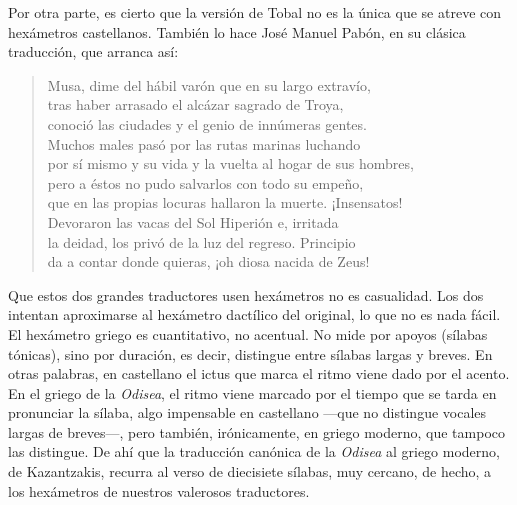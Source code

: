 Por otra parte, es cierto que la versión de Tobal no es la única que se atreve con hexámetros castellanos. También lo hace José Manuel Pabón, en su clásica traducción, que arranca así:


\begin{verse}
Musa, dime del hábil varón que en su largo extravío,\\
tras haber arrasado el alcázar sagrado de Troya,\\
conoció las ciudades y el genio de innúmeras gentes.\\
Muchos males pasó por las rutas marinas luchando\\
por sí mismo y su vida y la vuelta al hogar de sus hombres,\\
pero a éstos no pudo salvarlos con todo su empeño,\\
que en las propias locuras hallaron la muerte. ¡Insensatos!\\
Devoraron las vacas del Sol Hiperión e, irritada\\
la deidad, los privó de la luz del regreso. Principio\\
da a contar donde quieras, ¡oh diosa nacida de Zeus!
\end{verse}

Que estos dos grandes traductores usen hexámetros no es casualidad. Los dos intentan aproximarse al hexámetro dactílico del original, lo que no es nada fácil. El hexámetro griego es cuantitativo, no acentual. No mide por apoyos (sílabas tónicas), sino por duración, es decir, distingue entre sílabas largas y breves. En otras palabras, en castellano el ictus que marca el ritmo viene dado por el acento. En el griego de la \emph{Odisea}, el ritmo viene marcado por el tiempo que se tarda en pronunciar la sílaba, algo impensable en castellano ---que no distingue vocales largas de breves---, pero también, irónicamente, en griego moderno, que tampoco las distingue. De ahí que la traducción canónica de la \emph{Odisea} al griego moderno, de Kazantzakis, recurra al verso de diecisiete sílabas, muy cercano, de hecho, a los hexámetros de nuestros valerosos traductores.

